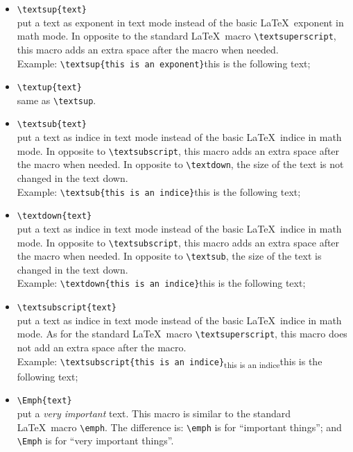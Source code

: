 \documentclass[book]{upmethodology-document}
\begin{document}
\begin{itemize}
\item \texttt{{\textbackslash}textsup\{text\}} \\
	put a text as exponent in text mode instead of the basic \LaTeX\ exponent in math mode. In opposite to the standard \LaTeX\ macro \texttt{{\textbackslash}textsuperscript}, this macro adds an extra space after the macro when needed. \\
	Example: \texttt{{\textbackslash}textsup\{this is an exponent\}}this is the following text;
\item \texttt{{\textbackslash}textup\{text\}} \\
	same as \texttt{{\textbackslash}textsup}.
\item \texttt{{\textbackslash}textsub\{text\}} \\
	put a text as indice in text mode instead of the basic \LaTeX\ indice in math mode. In opposite to \texttt{{\textbackslash}textsubscript}, this macro adds an extra space after the macro when needed. In opposite to \texttt{{\textbackslash}textdown}, the size of the text is not changed in the text down. \\
	Example: \texttt{{\textbackslash}textsub\{this is an indice\}}this is the following text;
\item \texttt{{\textbackslash}textdown\{text\}} \\
	put a text as indice in text mode instead of the basic \LaTeX\ indice in math mode. In opposite to \texttt{{\textbackslash}textsubscript}, this macro adds an extra space after the macro when needed. In opposite to \texttt{{\textbackslash}textsub}, the size of the text is changed in the text down. \\
	Example: \texttt{{\textbackslash}textdown\{this is an indice\}}this is the following text;
\item \texttt{{\textbackslash}textsubscript\{text\}} \\
	put a text as indice in text mode instead of the basic \LaTeX\ indice in math mode. As for the standard \LaTeX\ macro \texttt{{\textbackslash}textsuperscript}, this macro does not add an extra space after the macro. \\
	Example: \texttt{{\textbackslash}textsubscript\{this is an indice\}}\textsubscript{this is an indice}this is the following text;
\item \texttt{{\textbackslash}Emph\{text\}} \\
	put a \emph{very important} text. This macro is similar to the standard \LaTeX\ macro \texttt{{\textbackslash}emph}. The difference is: \texttt{{\textbackslash}emph} is for ``important things''; and \texttt{{\textbackslash}Emph} is for ``very important things''.\\

\end{itemize}
\end{document}
